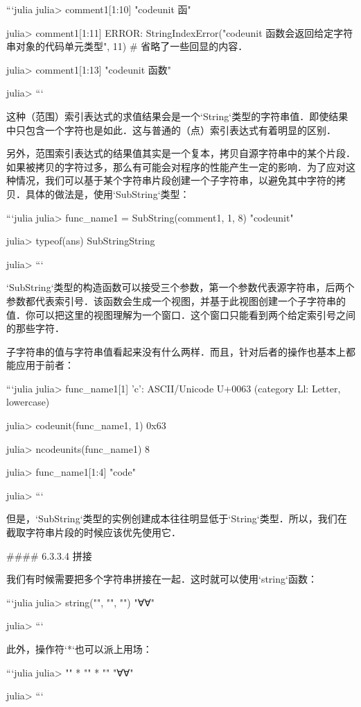 ```julia
julia> comment1[1:10]
"codeunit 函"

julia> comment1[1:11]
ERROR: StringIndexError("codeunit 函数会返回给定字符串对象的代码单元类型", 11)
# 省略了一些回显的内容．

julia> comment1[1:13]
"codeunit 函数"

julia> 
```

这种（范围）索引表达式的求值结果会是一个`String`类型的字符串值．即使结果中只包含一个字符也是如此．这与普通的（点）索引表达式有着明显的区别．

另外，范围索引表达式的结果值其实是一个复本，拷贝自源字符串中的某个片段．如果被拷贝的字符过多，那么有可能会对程序的性能产生一定的影响．为了应对这种情况，我们可以基于某个字符串片段创建一个子字符串，以避免其中字符的拷贝．具体的做法是，使用`SubString`类型：

```julia
julia> func_name1 = SubString(comment1, 1, 8)
"codeunit"

julia> typeof(ans)
SubString{String}

julia> 
```

`SubString`类型的构造函数可以接受三个参数，第一个参数代表源字符串，后两个参数都代表索引号．该函数会生成一个视图，并基于此视图创建一个子字符串的值．你可以把这里的视图理解为一个窗口．这个窗口只能看到两个给定索引号之间的那些字符．

子字符串的值与字符串值看起来没有什么两样．而且，针对后者的操作也基本上都能应用于前者：

```julia
julia> func_name1[1]
'c': ASCII/Unicode U+0063 (category Ll: Letter, lowercase)

julia> codeunit(func_name1, 1)
0x63

julia> ncodeunits(func_name1)
8

julia> func_name1[1:4]
"code"

julia> 
```

但是，`SubString`类型的实例创建成本往往明显低于`String`类型．所以，我们在截取字符串片段的时候应该优先使用它．

#### 6.3.3.4 拼接

我们有时候需要把多个字符串拼接在一起．这时就可以使用`string`函数：

```julia
julia> string("", "", "")
"∀∀"

julia> 
```

此外，操作符`*`也可以派上用场：

```julia
julia> "" * "" * ""
"∀∀"

julia> 
```

